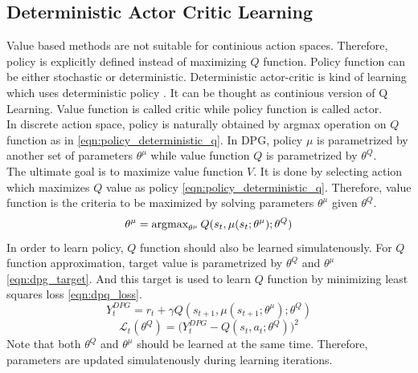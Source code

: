 \subsection{Deterministic Actor Critic Learning}
Value based methods are not suitable for continious action spaces. Therefore, policy is explicitly defined instead of maximizing $Q$ function. Policy function can be either stochastic or deterministic.  Deterministic actor-critic is kind of learning which uses deterministic policy \cite{silver_deterministic_2014}. It can be thought as continious version of Q Learning. Value function is called critic while policy function is called actor. \\
In discrete action space, policy is naturally obtained by argmax operation on $Q$ function as in \eqref{eqn:policy_deterministic_q}. In DPG, policy $\mu$ is parametrized by another set of parameters $\theta^\mu$ while value function $Q$ is parametrized by $\theta^Q$. \\
The ultimate goal is to maximize value function $V$. It is done by selecting action which maximizes $Q$ value as policy \eqref{eqn:policy_deterministic_q}. Therefore, value function is the criteria to be maximized by solving parameters $\theta^\mu$ given $\theta^Q$. 
\begin{equation}
\label{eqn:dpg_value_maximization}
\theta^\mu = \operatorname{\textup{argmax}}_{\theta^\mu} Q(s_t, \mu(s_t;\theta^\mu);\theta^Q)
\end{equation}
In order to learn policy, $Q$ function should also be learned simulatenously. For $Q$ function approximation, target value is parametrized by $\theta^Q$ and $\theta^\mu$ \eqref{eqn:dpg_target}. And this target is used to learn $Q$ function by minimizing least squares loss \eqref{eqn:dpq_loss}. \\
\begin{equation}
\label{eqn:dpg_target}
Y_t^{DPG} = r_t + \gamma Q(s_{t+1}, \mu(s_{t+1};\theta^\mu);\theta^Q)
\end{equation}
\begin{equation}
\label{eqn:dpq_loss}
\mathcal{L}_t(\theta^Q) = \big( Y_t^{DPG} - Q(s_t,a_t;\theta^Q) \big) ^ 2
\end{equation}
Note that both $\theta^Q$ and $\theta^\mu$ should be learned at the same time. Therefore, parameters are updated simulatenously during learning iterations. \\
